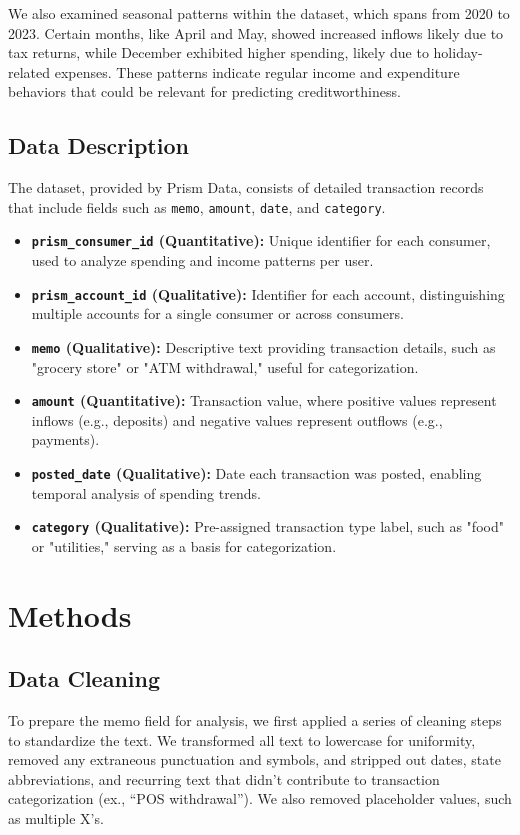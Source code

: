 \documentclass[12pt,letterpaper]{article}
\begin{document}
We also examined seasonal patterns within the dataset, which spans from 2020 to 2023. Certain months, like April and May, showed increased inflows likely due to tax returns, while December exhibited higher spending, likely due to holiday-related expenses. These patterns indicate regular income and expenditure behaviors that could be relevant for predicting creditworthiness.

\subsection{Data Description}
The dataset, provided by Prism Data, consists of detailed transaction records that include fields such as \texttt{memo}, \texttt{amount}, \texttt{date}, and \texttt{category}.
\begin{itemize}
    \item \textbf{\texttt{prism\_consumer\_id} (Quantitative):} Unique identifier for each consumer, used to analyze spending and income patterns per user.

    \item \textbf{\texttt{prism\_account\_id} (Qualitative):} Identifier for each account, distinguishing multiple accounts for a single consumer or across consumers.

    \item \textbf{\texttt{memo} (Qualitative):} Descriptive text providing transaction details, such as "grocery store" or "ATM withdrawal," useful for categorization.

    \item \textbf{\texttt{amount} (Quantitative):} Transaction value, where positive values represent inflows (e.g., deposits) and negative values represent outflows (e.g., payments).

    \item \textbf{\texttt{posted\_date} (Qualitative):} Date each transaction was posted, enabling temporal analysis of spending trends.

    \item \textbf{\texttt{category} (Qualitative):} Pre-assigned transaction type label, such as "food" or "utilities," serving as a basis for categorization.
\end{itemize}


\section{Methods}
\subsection{Data Cleaning}
To prepare the memo field for analysis, we first applied a series of cleaning steps to standardize the text. We transformed all text to lowercase for uniformity, removed any extraneous punctuation and symbols, and stripped out dates, state abbreviations, and recurring text that didn’t contribute to transaction categorization (ex., “POS withdrawal”). We also removed placeholder values, such as multiple X’s.
\end{document}
